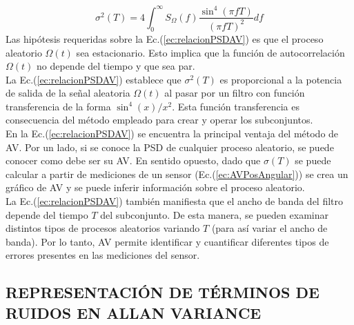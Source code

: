 \documentclass[a4paper,11pt,twoside]{IT-CNEA}
\begin{document}
\begin{equation}
\sigma^2(T)=4\int_0^{\infty}S_{\Omega}(f)\frac{\sin^4(\pi fT)}{\left( \pi fT\right)^2}df
\label{ec:relacionPSDAV}
\end{equation}
Las hipótesis requeridas sobre la Ec.(\ref{ec:relacionPSDAV}) es que el proceso aleatorio $\Omega(t)$ sea estacionario. Esto implica que la función de autocorrelación $\Omega(t)$ no depende del tiempo y que sea par.
\\ La Ec.(\ref{ec:relacionPSDAV}) establece que $\sigma^2(T)$ es proporcional a la potencia de salida de la señal aleatoria $\Omega(t)$ al pasar por un filtro con función transferencia de la forma $\sin^4(x)/x^2$. Esta función transferencia es consecuencia del método empleado para crear y operar los subconjuntos. 
\\ En la Ec.(\ref{ec:relacionPSDAV}) se encuentra la principal ventaja del método de AV. Por un lado, si se conoce la PSD de cualquier proceso aleatorio, se puede conocer como debe ser su AV. En sentido opuesto, dado que $\sigma(T)$ se puede calcular a partir de mediciones de un sensor (Ec.(\ref{ec:AVPosAngular})) se crea un gráfico de AV y se puede inferir información sobre el proceso aleatorio.
\\ La Ec.(\ref{ec:relacionPSDAV}) también manifiesta que el ancho de banda del filtro depende del tiempo $T$ del subconjunto. De esta manera, se pueden examinar distintos tipos de procesos aleatorios variando $T$ (para así variar el ancho de banda). Por lo tanto, AV permite identificar y cuantificar diferentes tipos de errores presentes en las mediciones del sensor. 
\subsection{REPRESENTACIÓN DE TÉRMINOS DE RUIDOS EN ALLAN VARIANCE}
\end{document}
